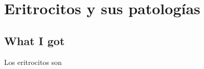 

\chapter{Eritrocitos y sus patologías}

\section{What I got}
\label{section:results}

Los eritrocitos son